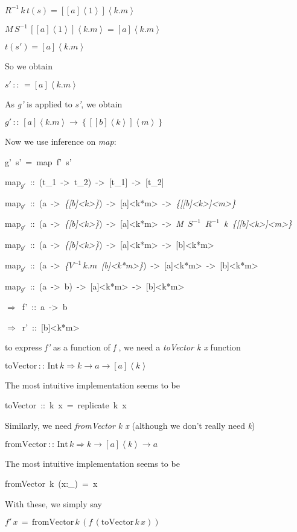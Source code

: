\documentclass{article}
\newenvironment{lyxcode}
{\par\begin{list}{}{
\setlength{\rightmargin}{\leftmargin}
\setlength{\listparindent}{0pt}\raggedright
\setlength{\itemsep}{0pt}
\setlength{\parsep}{0pt}
\normalfont\ttfamily}\item[]}
{\end{list}}
\begin{document}
$R^{-1}\, k\, t(s)=[[a]\left\langle 1\right\rangle ]\left\langle k.m\right\rangle $

$M\, S^{-1}\,[[a]\left\langle 1\right\rangle ]\left\langle k.m\right\rangle =[a]\left\langle k.m\right\rangle $

\emph{$t(s')=[a]\left\langle k.m\right\rangle $}

So we obtain
\begin{lyxcode}
$s'\,::\,=[a]\left\langle k.m\right\rangle $
\end{lyxcode}
As \emph{g'} is applied to \emph{s'}, we obtain 
\begin{lyxcode}
$g'\,::\,[a]\left\langle k.m\right\rangle \rightarrow\left\{ [[b]\left\langle k\right\rangle ]\left\langle m\right\rangle \right\} $
\end{lyxcode}
Now we use inference on \emph{map}:
\begin{lyxcode}
g'~s'~=~map~f'~s'

map$_{g'}$~::~(t\_1~->~t\_2)~->~{[}t\_1{]}~->~{[}t\_2{]}

map$_{g'}$~::~(a~->~\emph{\{{[}b{]}<k>\}})~->~{[}a{]}<k{*}m>~->~\emph{\{{[}{[}b{]}<k>{]}<m>\}}

map$_{g'}$~::~(a~->~\emph{\{{[}b{]}<k>\}})~->~{[}a{]}<k{*}m>~->~\emph{M~}$S^{-1}$~$R^{-1}$\emph{~k~\{{[}{[}b{]}<k>{]}<m>\}}

map$_{g'}$~::~(a~->~\emph{\{{[}b{]}<k>\}})~->~{[}a{]}<k{*}m>~->~{[}b{]}<k{*}m>

map$_{g'}$~::~(a~->~\emph{\{}$V^{-1}\, k.m$~\emph{{[}b{]}<k{*}m>\}})~->~{[}a{]}<k{*}m>~->~{[}b{]}<k{*}m>

map$_{g'}$~::~(a~->~b)~->~{[}a{]}<k{*}m>~->~{[}b{]}<k{*}m>

$\Rightarrow$~f'~::~a~->~b

$\Rightarrow$~r'~::~{[}b{]}<k{*}m>
\end{lyxcode}
to express \emph{f'} as a function of \emph{f} , we need a \emph{toVector
k x} function
\begin{lyxcode}
$\mbox{toVector}\,::\,\mbox{Int}\, k\Rightarrow k\rightarrow a\rightarrow[a]\left\langle k\right\rangle $
\end{lyxcode}
The most intuitive implementation seems to be
\begin{lyxcode}
toVector~::~k~x~=~replicate~k~x
\end{lyxcode}
Similarly, we need \emph{fromVector k x} (although we don't really
need \emph{k})
\begin{lyxcode}
$\mbox{fromVector}\,::\,\mbox{Int}\, k\Rightarrow k\rightarrow[a]\left\langle k\right\rangle \rightarrow a$
\end{lyxcode}
The most intuitive implementation seems to be
\begin{lyxcode}
fromVector~k~(x:\_)~=~x
\end{lyxcode}
With these, we simply say
\begin{lyxcode}
$f'\, x\,=\,\mbox{fromVector}\, k\,\left(f\,\left(\mbox{toVector}\, k\, x\right)\right)$
\end{lyxcode}
\end{document}
